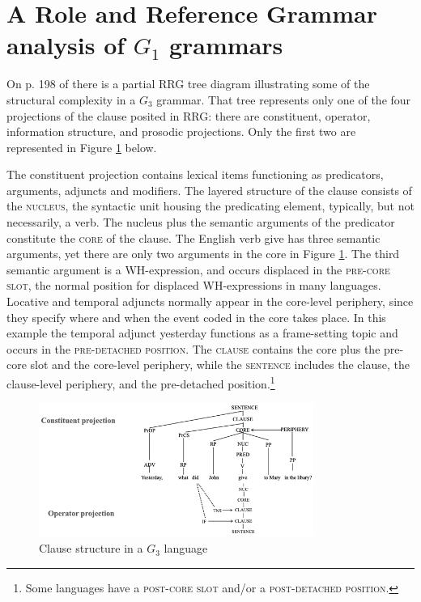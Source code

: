 \documentclass[output=paper,colorlinks,citecolor=brown]{langscibook}
\begin{document}
\section{A Role and Reference Grammar analysis of $G_1$ grammars}\label{sec:vanvalin:3}

On p. 198 of  there is a partial RRG tree diagram illustrating some of the structural complexity in a $G_3$ grammar.  That tree represents only one of the four projections of the clause posited in RRG: there are constituent, operator, information structure, and prosodic projections. Only the first two are represented in Figure \ref{fig:fig1} below.  

The constituent projection contains lexical items functioning as predicators, arguments, adjuncts and modifiers.  The layered structure of the clause consists of the \textsc{nucleus}, the syntactic unit housing the predicating element, typically, but not necessarily, a verb.  The nucleus plus the semantic arguments of the predicator constitute the \textsc{core} of the clause.  The English verb give has three semantic arguments, yet there are only two arguments in the core in Figure \ref{fig:fig1}. The third semantic argument is a WH-expression, and occurs displaced in the \textsc{pre-core slot}, the normal position for displaced WH-expressions in many languages. Locative and temporal adjuncts normally appear in the core-level periphery, since they specify where and when the event coded in the core takes place.  In this example the temporal adjunct yesterday functions as a frame-setting topic and occurs in the \textsc{pre-detached position}.  The \textsc{clause} contains the core plus the pre-core slot and the core-level periphery, while the \textsc{sentence} includes the clause, the clause-level periphery, and the pre-detached position.\footnote{Some languages have a  \textsc{post-core slot} and/or a \textsc{post-detached position}.}

\begin{figure}
\centering
\includegraphics[width=0.8\textwidth]{vanvalin_figure1.png}
\caption{\label{fig:fig1}Clause structure in a $G_3$ language}
\end{figure}
\end{document}

